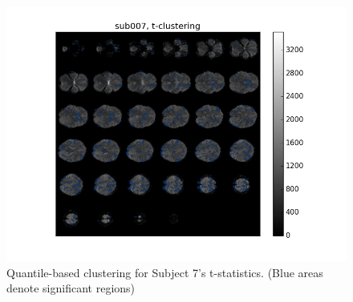 \begin{figure}[H]
\begin{minipage}[b]{0.66\linewidth}
	\centering
		\includegraphics[width=.8\linewidth]{../images/sub007_t_overlay.png} 
	\caption{Quantile-based clustering for Subject 7's t-statistics. (Blue areas denote significant regions)}
	\label{fig:clustersub7}
\end{minipage}
\end{figure}




